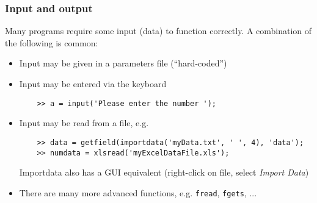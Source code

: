 
\begin{frame}[fragile]
 \frametitle{Input and output}
 Many programs require some input (data) to function correctly. A combination of the following is common:
 \begin{itemize}[<+->]
   \item Input may be given in a parameters file (``hard-coded'')
   \item Input may be entered via the keyboard
   \begin{lstlisting}
    >> a = input('Please enter the number ');
  \end{lstlisting}
  \item Input may be read from a file, e.g.
  \begin{lstlisting}
    >> data = getfield(importdata('myData.txt', ' ', 4), 'data');
    >> numdata = xlsread('myExcelDataFile.xls');
  \end{lstlisting}
  Importdata also has a GUI equivalent (right-click on file, select \emph{Import Data})
   \item There are many more advanced functions, e.g. \lstinline$fread$, \lstinline$fgets$, ...
 \end{itemize}
\end{frame}

